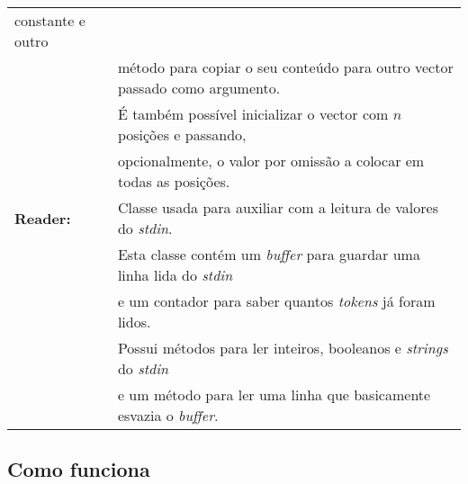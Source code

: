 {\begin{tabular}{ll}
															constante e outro \\
					&método para copiar o seu conteúdo para outro vector passado 
															como argumento. \\
					&É também possível inicializar o vector com $n$ posições 
																e passando, \\
					&opcionalmente, o valor por omissão a colocar em todas as 
																	posições.\\
\hline
\textbf{Reader:}	&Classe usada para auxiliar com a leitura de valores do 
																\emph{stdin}. \\
					&Esta classe contém um \emph{buffer} para guardar uma linha 
														lida do \emph{stdin} \\
					&e um contador para saber quantos \emph{tokens} já foram 
																	lidos. \\
					&Possui métodos para ler inteiros, booleanos e 
											\emph{strings} do \emph{stdin} \\
					& e um método para ler uma linha que basicamente esvazia o 
																\emph{buffer}.\\
\end{tabular}
}

\subsection{Como funciona}


